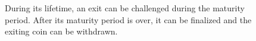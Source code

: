 \begin{figure}[H]
	\caption{
		During its lifetime, an exit can be challenged during the maturity period. After its maturity period is over, it can be
        finalized and the exiting coin can be withdrawn.
	}
    \label{fig:exit_lifetime}
\end{figure}
